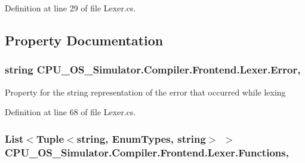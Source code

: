 Definition at line 29 of file Lexer.\+cs.



\subsection{Property Documentation}
\hypertarget{class_c_p_u___o_s___simulator_1_1_compiler_1_1_frontend_1_1_lexer_a0e9d13cd92a7b359a8857e940f0af767}{}
\subsubsection[{Error}]{\setlength{\rightskip}{0pt plus 5cm}string C\+P\+U\+\_\+\+O\+S\+\_\+\+Simulator.\+Compiler.\+Frontend.\+Lexer.\+Error\hspace{0.3cm}{\ttfamily [get]}, {\ttfamily [set]}}\label{class_c_p_u___o_s___simulator_1_1_compiler_1_1_frontend_1_1_lexer_a0e9d13cd92a7b359a8857e940f0af767}


Property for the string representation of the error that occurred while lexing 



Definition at line 68 of file Lexer.\+cs.

\hypertarget{class_c_p_u___o_s___simulator_1_1_compiler_1_1_frontend_1_1_lexer_ac414167d172802ee774d998b1c20b2dd}{}
\subsubsection[{Functions}]{\setlength{\rightskip}{0pt plus 5cm}List$<$Tuple$<$string, {\bf Enum\+Types}, string$>$ $>$ C\+P\+U\+\_\+\+O\+S\+\_\+\+Simulator.\+Compiler.\+Frontend.\+Lexer.\+Functions\hspace{0.3cm}{\ttfamily [get]}, {\ttfamily [set]}}\label{class_c_p_u___o_s___simulator_1_1_compiler_1_1_frontend_1_1_lexer_ac414167d172802ee774d998b1c20b2dd}


